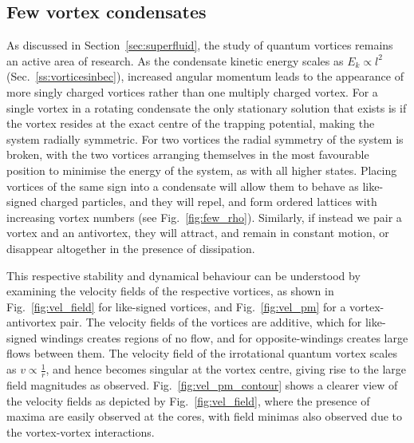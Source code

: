 \subsection{Few vortex condensates}

As discussed in Section~\ref{sec:superfluid}, the study of quantum vortices remains an active area of research. As the condensate kinetic energy scales as $E_k \propto l^2$ (Sec.~\ref{ss:vorticesinbec}), increased angular momentum leads to the appearance of more singly charged vortices rather than one multiply charged vortex. For a single vortex in a rotating condensate the only stationary solution that exists is if the vortex resides at the exact centre of the trapping potential, making the system radially symmetric. For two vortices the radial symmetry of the system is broken, with the two vortices arranging themselves in the most favourable position to minimise the energy of the system, as with all higher states. Placing vortices of the same sign into a condensate will allow them to behave as like-signed charged particles, and they will repel, and form ordered lattices with increasing vortex numbers (see Fig.~\ref{fig:few_rho}). Similarly, if instead we pair a vortex and an antivortex, they will attract, and remain in constant motion, or disappear altogether in the presence of dissipation.

This respective stability and dynamical behaviour can be understood by examining the velocity fields of the respective vortices, as shown in Fig.~\ref{fig:vel_field} for like-signed vortices, and Fig.~\ref{fig:vel_pm} for a vortex-antivortex pair. The velocity fields of the vortices are additive, which for like-signed windings creates regions of no flow, and for opposite-windings creates large flows between them. The velocity field of the irrotational quantum vortex scales as $v \propto \frac{1}{r}$, and hence becomes singular at the vortex centre, giving rise to the large field magnitudes as observed. Fig.~\ref{fig:vel_pm_contour} shows a clearer view of the velocity fields as depicted by Fig.~\ref{fig:vel_field}, where the presence of maxima are easily observed at the cores, with field minimas also observed due to the vortex-vortex interactions.

